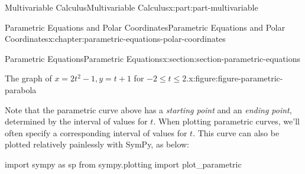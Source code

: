 \documentclass[twoside,10pt,]{book}
\numberwithin{equation}{part}
\begin{document}
\begin{partptx}{Multivariable Calculus}{}{Multivariable Calculus}{}{}{x:part:part-multivariable}
\begin{chapterptx}{Parametric Equations and Polar Coordinates}{}{Parametric Equations and Polar Coordinates}{}{}{x:chapter:parametric-equations-polar-coordinates}
\begin{sectionptx}{Parametric Equations}{}{Parametric Equations}{}{}{x:section:section-parametric-equations}
\begin{figureptx}{The graph of \(x = 2t^2-1, y=t+1\) for \(-2\leq t\leq 2\).}{x:figure:figure-parametric-parabola}{}
\begin{image}{0}{1}{0}
{
}%
\end{image}%
\tcblower
\end{figureptx}%
Note that the parametric curve above has a \emph{starting point} and an \emph{ending point}, determined by the interval of values for \(t\). When plotting parametric curves, we'll often specify a corresponding interval of values for \(t\). This curve can also be plotted relatively painlessly with SymPy, as below:%
\begin{sageinput}
import sympy as sp
from sympy.plotting import plot_parametric


\end{sageinput}
\end{sectionptx}
\end{chapterptx}
\end{partptx}
\end{document}
